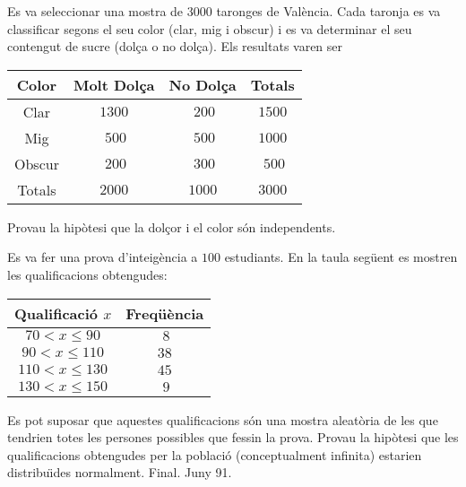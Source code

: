 \begin{prob}
{Es va seleccionar una mostra de $3000$ taronges de Val\`encia. Cada
taronja es va classificar segons el seu color (clar, mig i obscur) i es va
determinar el seu contengut de sucre (dol\c{c}a o no dol\c{c}a). Els resultats varen
ser
\begin{center}
\begin{tabular}{|c||c|c||c|}
\hline Color&Molt Dol\c{c}a&No
Dol\c{c}a&Totals\\\hline\hline Clar&$1300$&$\ 200$&$1500$
\\\hline Mig&$\ 500$&$\ 500$&$1000$\\\hline Obscur
&$\ 200$&$\ 300$&$\ 500$\\\hline Totals
&$2000$&$1000$&$3000$\\\hline 
\end{tabular}
\end{center}

Provau la hip\`otesi que la dol\c{c}or i el color s\'on independents.
}
\end{prob} 

\begin{prob}
{Es va fer una prova d'inte{\lgem}ig\`encia a $100$
estudiants. En la taula seg\"uent es mostren les qualificacions
obtengudes:
\begin{center}
\begin{tabular}{|c|c|}
\hline
Qualificaci\'o $x$&Freq\"u\`encia\\
\hline\hline
$70<x\leq 90$&$\ 8$\\\hline
$90<x\leq 110$&$38$\\\hline
$110<x\leq 130$&$45$\\\hline
$130<x\leq 150$&$\ 9$\\\hline 
\end{tabular}
\end{center}

Es pot suposar que aquestes qualificacions s\'on una
mostra aleat\`oria de les que tendrien totes les persones
possibles que fessin la prova. Provau la hip\`otesi que les
qualificacions obtengudes per la poblaci\'o (conceptualment
infinita) estarien distribu\"{\i}des normalment.
\newline
{\footnotesize
Final. Juny 91.}}
\end{prob} 

